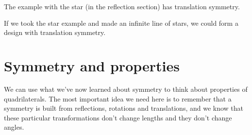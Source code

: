 \documentclass{ximera}
\begin{document}
\begin{question}
The example with the star (in the reflection section) has translation symmetry.
\begin{multipleChoice}
\end{multipleChoice}

If we took the star example and made  an infinite line of stars, we could form a design with translation symmetry.
\begin{multipleChoice}
\end{multipleChoice}
\end{question}


\section{Symmetry and properties}

We can use what we've now learned about symmetry to think about properties of quadrilaterals. The most important idea we need here is to remember that a symmetry is built from reflections, rotations and translations, and we know that these particular transformations don't change lengths and they don't change angles.
\end{document}
